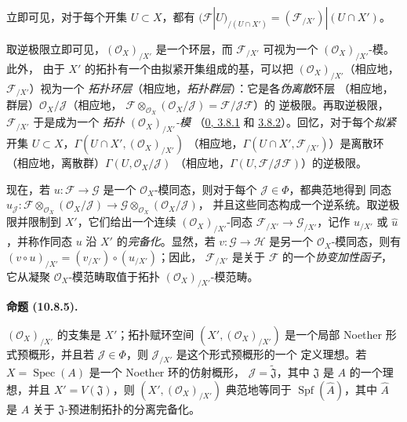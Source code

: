 \documentclass[UTF8,fontset=none,11pt,oneside,openany]{ctexbook}
\newenvironment{proposition}[1][]{%
  \par\medskip\noindent\textbf{命题 (#1).}\ %
}{\par}
\let\EGAOriginalLabel\label
\renewcommand{\label}[1]{\phantomsection\EGAOriginalLabel{#1}}
\begin{document}
立即可见，对于每个开集 $U\subset X$，都有
$(\mathscr{F}|U)_{/(U\cap X')}=(\mathscr{F}_{/X'})|(U\cap X')$。

取逆极限立即可见，$(\mathscr{O}_X)_{/X'}$ 是一个环层，而
$\mathscr{F}_{/X'}$ 可视为一个 $(\mathscr{O}_X)_{/X'}$-模。此外，
由于 $X'$ 的拓扑有一个由拟紧开集组成的基，可以把
$(\mathscr{O}_X)_{/X'}$（相应地，$\mathscr{F}_{/X'}$）视为一个
\emph{拓扑环层}（相应地，\emph{拓扑群层}）：它是各\emph{伪离散}环层
（相应地，群层）$\mathscr{O}_X/\mathscr{J}$（相应地，
$\mathscr{F}\otimes_{\mathscr{O}_X}
(\mathscr{O}_X/\mathscr{J})=\mathscr{F}/\mathscr{J}\mathscr{F}$）的
逆极限。再取逆极限，$\mathscr{F}_{/X'}$ 于是成为一个
\emph{拓扑 $(\mathscr{O}_X)_{/X'}$-模}
（\hyperref[0.3.8.1-fr]{0, 3.8.1} 和
\hyperref[0.3.8.2-fr]{3.8.2}）。回忆，对于每个\emph{拟紧}开集
$U\subset X$，$\Gamma(U\cap X',(\mathscr{O}_X)_{/X'})$
（相应地，$\Gamma(U\cap X',\mathscr{F}_{/X'})$）是离散环
（相应地，离散群）$\Gamma(U,\mathscr{O}_X/\mathscr{J})$
（相应地，$\Gamma(U,\mathscr{F}/\mathscr{J}\mathscr{F})$）的逆极限。

现在，若 $u:\mathscr{F}\to\mathscr{G}$ 是一个
$\mathscr{O}_X$-模同态，则对于每个 $\mathscr{J}\in\Phi$，都典范地得到
同态
$u_{\mathscr{J}}:
\mathscr{F}\otimes_{\mathscr{O}_X}(\mathscr{O}_X/\mathscr{J})
\to
\mathscr{G}\otimes_{\mathscr{O}_X}(\mathscr{O}_X/\mathscr{J})$，
并且这些同态构成一个逆系统。取逆极限并限制到 $X'$，它们给出一个连续
$(\mathscr{O}_X)_{/X'}$-同态
$\mathscr{F}_{/X'}\to\mathscr{G}_{/X'}$，记作 $u_{/X'}$ 或
$\widehat u$，并称作同态 $u$ 沿 $X'$ 的\emph{完备化}。显然，若
$v:\mathscr{G}\to\mathscr{H}$ 是另一个 $\mathscr{O}_X$-模同态，则有
$(v\circ u)_{/X'}=(v_{/X'})\circ(u_{/X'})$；因此，
$\mathscr{F}_{/X'}$ 是关于 $\mathscr{F}$ 的一个\emph{协变加性函子}，
它从凝聚 $\mathscr{O}_X$-模范畴取值于拓扑
$(\mathscr{O}_X)_{/X'}$-模范畴。

\begin{proposition}[10.8.5]
\label{I.10.8.5-fr}
$(\mathscr{O}_X)_{/X'}$ 的支集是 $X'$；拓扑赋环空间
$(X',(\mathscr{O}_X)_{/X'})$ 是一个局部 Noether 形式预概形，并且若
$\mathscr{J}\in\Phi$，则 $\mathscr{J}_{/X'}$ 是这个形式预概形的一个
定义理想。若 $X=\operatorname{Spec}(A)$ 是一个 Noether 环的仿射概形，
$\mathscr{J}=\widetilde{\mathfrak{J}}$，其中
$\mathfrak{J}$ 是 $A$ 的一个理想，并且
$X'=V(\mathfrak{J})$，则 $(X',(\mathscr{O}_X)_{/X'})$ 典范地等同于
$\operatorname{Spf}(\widehat A)$，其中 $\widehat A$ 是 $A$ 关于
$\mathfrak{J}$-预进制拓扑的分离完备化。
\end{proposition}
\end{document}
